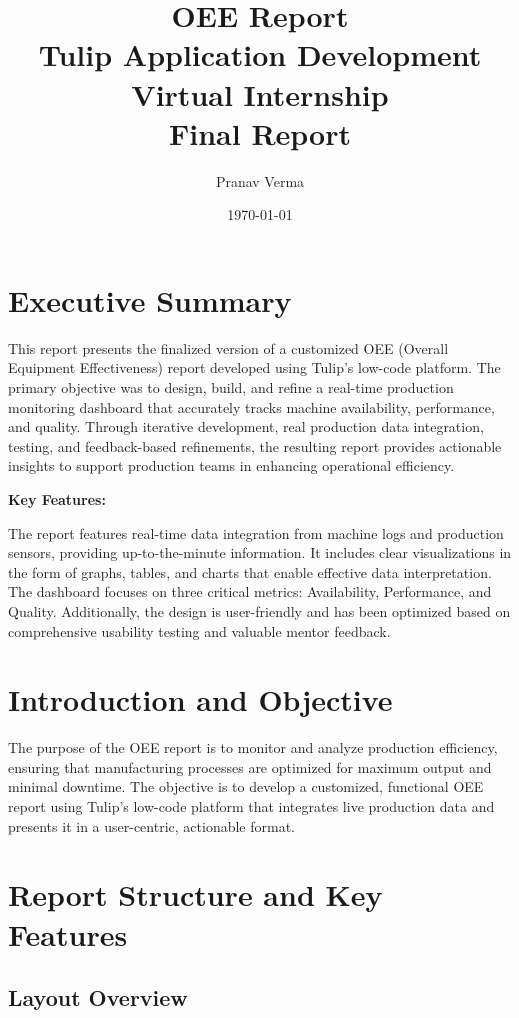 \documentclass[a4paper,12pt]{article}
\title{OEE Report \\ \large Tulip Application Development Virtual Internship \\ Final Report}
\author{Pranav Verma}
\date{\today}
\begin{document}
\maketitle
\tableofcontents
\newpage

\section{Executive Summary}

This report presents the finalized version of a customized OEE (Overall Equipment Effectiveness) report developed using Tulip's low-code platform. The primary objective was to design, build, and refine a real-time production monitoring dashboard that accurately tracks machine availability, performance, and quality. Through iterative development, real production data integration, testing, and feedback-based refinements, the resulting report provides actionable insights to support production teams in enhancing operational efficiency.

\vspace{0.5cm}
\noindent\textbf{Key Features:}

The report features real-time data integration from machine logs and production sensors, providing up-to-the-minute information. It includes clear visualizations in the form of graphs, tables, and charts that enable effective data interpretation. The dashboard focuses on three critical metrics: Availability, Performance, and Quality. Additionally, the design is user-friendly and has been optimized based on comprehensive usability testing and valuable mentor feedback.

\section{Introduction and Objective}

The purpose of the OEE report is to monitor and analyze production efficiency, ensuring that manufacturing processes are optimized for maximum output and minimal downtime. The objective is to develop a customized, functional OEE report using Tulip's low-code platform that integrates live production data and presents it in a user-centric, actionable format.

\section{Report Structure and Key Features}

\subsection{Layout Overview}
\end{document}
